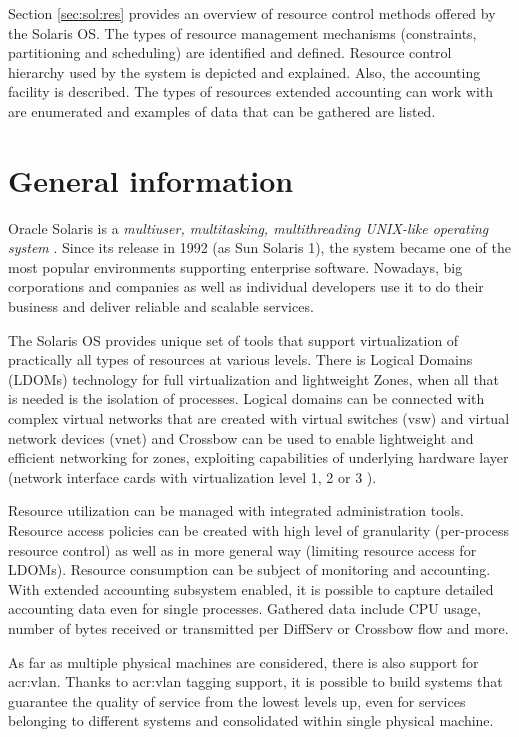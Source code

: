 \documentclass[11pt]{book}
\begin{document}
    Section \ref{sec:sol:res} provides an overview of resource control methods offered by the Solaris OS. The types
    of resource management mechanisms (constraints, partitioning and scheduling) are identified and defined. Resource
    control hierarchy used by the system is depicted and explained. Also, the accounting facility is described. The
    types of resources extended accounting can work with are enumerated and examples of data that can be gathered are
    listed.


    \section{General information}
    \label{sec:sol:general}

      Oracle Solaris is a \textit{multiuser, multitasking, multithreading UNIX-like operating system} \cite{reference}.
      Since its release in 1992 (as Sun Solaris 1), the system became one of the most popular environments supporting
      enterprise software. Nowadays, big corporations and companies as well as individual developers use it to do their
      business and deliver reliable and scalable services.

      The Solaris OS provides unique set of tools that support virtualization of practically all types of resources at
      various levels. There is Logical Domains (LDOMs) technology for full virtualization and lightweight Zones, when
      all that is needed is the isolation of processes. Logical domains can be connected with complex virtual networks
      that are created with virtual switches (vsw) and virtual network devices (vnet) \cite{ldomag} and Crossbow can be
      used to enable lightweight and efficient networking for zones, exploiting capabilities of underlying hardware
      layer (network interface cards with virtualization level 1, 2 or 3 \cite{santos}).

      Resource utilization can be managed with integrated administration tools. Resource access policies can be created
      with high level of granularity (per-process resource control) as well as in more general way (limiting resource
      access for LDOMs). Resource consumption can be subject of monitoring and accounting. With extended accounting
      subsystem enabled, it is possible to capture detailed accounting data even for single processes. Gathered data
      include CPU usage, number of bytes received or transmitted per DiffServ or Crossbow flow and more.

      As far as multiple physical machines are considered, there is also support for \gls{acr:vlan}.  Thanks to \gls{acr:vlan}
      tagging support, it is possible to build systems that guarantee the quality of service from the lowest levels up,
      even for services belonging to different systems and consolidated within single physical machine.
\end{document}
